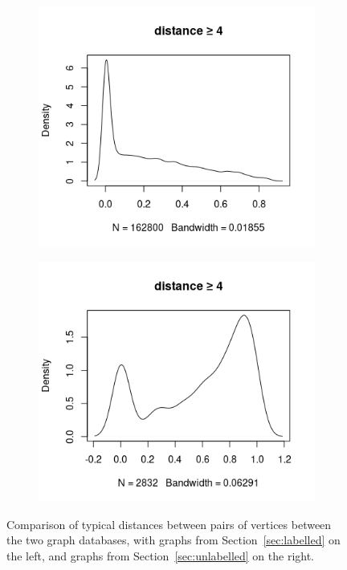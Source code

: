 \documentclass{l4proj}
\theoremstyle{definition}
\theoremstyle{remark}
\begin{document}
\begin{appendices}
\begin{figure}
\begin{subfigure}[t]{0.49\textwidth}
      \centering
      \includegraphics[width=\textwidth]{images/mcs_prop4.png}
    \end{subfigure}
    \begin{subfigure}[t]{0.49\textwidth}
      \centering
      \includegraphics[width=\textwidth]{images/sip_prop4.png}
    \end{subfigure}
    \caption{Comparison of typical distances between pairs of vertices between the
      two graph databases, with graphs from Section~\ref{sec:labelled} on the left,
      and graphs from Section~\ref{sec:unlabelled} on the right.}
    \label{fig:proportions}
  \end{figure}


\end{appendices}
\end{document}
